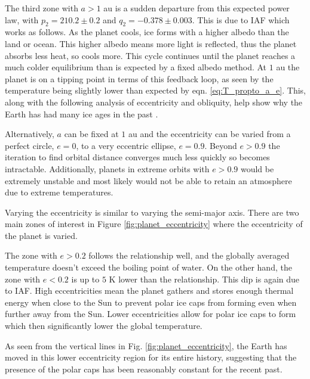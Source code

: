 \documentclass[12pt, onecolumn]{revtex4-2}    %
\begin{document}
The third zone with $a > 1$ au is a sudden departure from this expected power law, with $p_2 = 210.2 \pm 0.2$ and $q_2 = -0.378 \pm 0.003$.
This is due to IAF which works as follows.
As the planet cools, ice forms with a higher albedo than the land or ocean.
This higher albedo means more light is reflected, thus the planet absorbs less heat, so cools more.
This cycle continues until the planet reaches a much colder equilibrium than is expected by a fixed albedo method.
At $1$ au the planet is on a tipping point in terms of this feedback loop, as seen by the temperature being slightly lower than expected by eqn. \eqref{eq:T_propto_a_e}.
This, along with the following analysis of eccentricity and obliquity, help show why the Earth has had many ice ages in the past \cite{Emiliani78}.

Alternatively, $a$ can be fixed at $1$ au and the eccentricity can be varied from a perfect circle, $e = 0$, to a very eccentric ellipse, $e = 0.9$.
Beyond $e > 0.9$ the iteration to find orbital distance converges much less quickly so becomes intractable.
Additionally, planets in extreme orbits with $e > 0.9$ would be extremely unstable and most likely would not be able to retain an atmosphere due to extreme temperatures.

Varying the eccentricity is similar to varying the semi-major axis.
There are two main zones of interest in Figure \ref{fig:planet_eccentricity} where the eccentricity of the planet is varied.

The zone with $e > 0.2$ follows the relationship well, and the globally averaged temperature doesn't exceed the boiling point of water.
On the other hand, the zone with $e < 0.2$ is up to $5$ K lower than the relationship.
This dip is again due to IAF.
High eccentricities mean the planet gathers and stores enough thermal energy when close to the Sun to prevent polar ice caps from forming even when further away from the Sun.
Lower eccentricities allow for polar ice caps to form which then significantly lower the global temperature.

As seen from the vertical lines in Fig. \ref{fig:planet_eccentricity}, the Earth has moved in this lower eccentricity region for its entire history, suggesting that the presence of the polar caps has been reasonably constant for the recent past.
\end{document}
